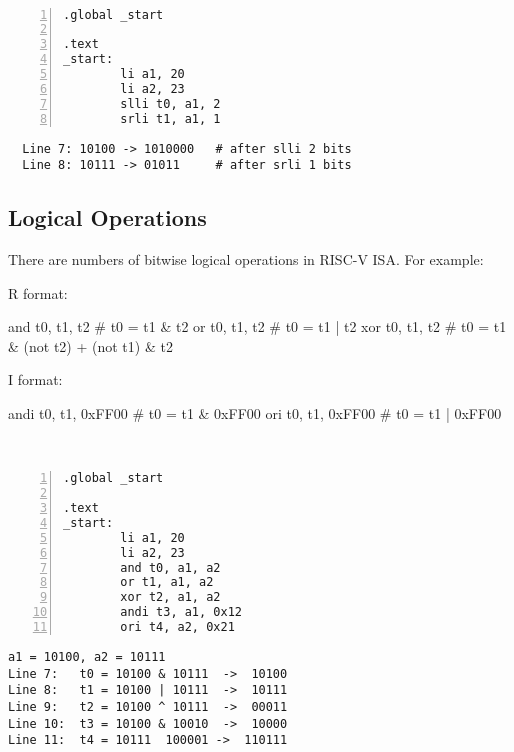\begin{eg}~

\begin{minipage}{0.4\textwidth}
\begin{Verbatim}[numbers=left,xleftmargin=5mm]
.global _start

.text
_start:
        li a1, 20
        li a2, 23
        slli t0, a1, 2
        srli t1, a1, 1
\end{Verbatim}
\end{minipage}
\begin{minipage}{0.6\textwidth}
\color{red}
\begin{verbatim}
  Line 7: 10100 -> 1010000   # after slli 2 bits
  Line 8: 10111 -> 01011     # after srli 1 bits
\end{verbatim}
\end{minipage}
\end{eg}

\subsection{Logical Operations}
There are numbers of bitwise logical operations in RISC-V ISA. For example: 

R format: 
\begin{codeBlock}
  and t0, t1, t2   # t0 = t1 & t2
  or  t0, t1, t2   # t0 = t1 | t2
  xor t0, t1, t2   # t0 = t1 & (not t2) + (not t1) & t2
\end{codeBlock}

I format: 
\begin{codeBlock}
  andi t0, t1, 0xFF00   # t0 = t1 & 0xFF00
  ori  t0, t1, 0xFF00   # t0 = t1 | 0xFF00
\end{codeBlock}

\begin{eg}~

\begin{minipage}{0.5\textwidth}
\begin{Verbatim}[numbers=left,xleftmargin=5mm]
.global _start

.text
_start:
        li a1, 20
        li a2, 23
        and t0, a1, a2
        or t1, a1, a2
        xor t2, a1, a2
        andi t3, a1, 0x12
        ori t4, a2, 0x21
\end{Verbatim}
\end{minipage}
\begin{minipage}{0.5\textwidth}
\color{red}
\begin{verbatim}
a1 = 10100, a2 = 10111
Line 7:   t0 = 10100 & 10111  ->  10100
Line 8:   t1 = 10100 | 10111  ->  10111
Line 9:   t2 = 10100 ^ 10111  ->  00011
Line 10:  t3 = 10100 & 10010  ->  10000
Line 11:  t4 = 10111  100001 ->  110111
\end{verbatim}
\end{minipage}
\end{eg}

